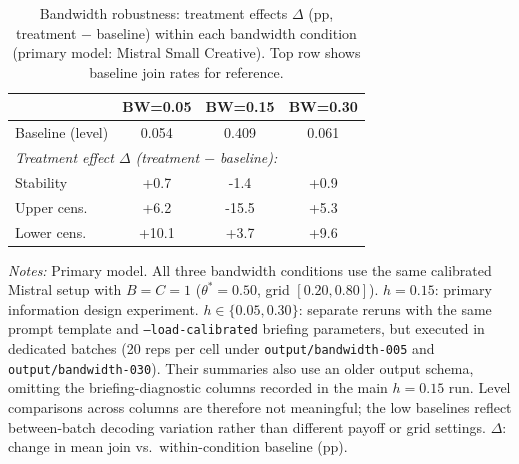 \begin{table}[t]
\centering
\caption{Bandwidth robustness: treatment effects $\Delta$ (pp, treatment $-$ baseline) within each bandwidth condition (primary model: Mistral Small Creative). Top row shows baseline join rates for reference.}
\label{tab:bandwidth}
\small
\begin{tabular}{lccc}
\toprule
 & BW=0.05 & BW=0.15 & BW=0.30 \\
\midrule
Baseline (level) & 0.054 & 0.409 & 0.061 \\
\midrule
\multicolumn{4}{l}{\textit{Treatment effect $\Delta$ (treatment $-$ baseline):}} \\
Stability & +0.7 & -1.4 & +0.9 \\
Upper cens. & +6.2 & -15.5 & +5.3 \\
Lower cens. & +10.1 & +3.7 & +9.6 \\
\bottomrule
\end{tabular}
\vspace{0.25em}
\parbox{\columnwidth}{\footnotesize\emph{Notes:} Primary model. All three bandwidth conditions use the same calibrated Mistral setup with $B = C = 1$ ($\theta^* = 0.50$, grid $[0.20, 0.80]$). $h = 0.15$: primary information design experiment. $h \in \{0.05, 0.30\}$: separate reruns with the same prompt template and \texttt{--load-calibrated} briefing parameters, but executed in dedicated batches (20 reps per cell under \texttt{output/bandwidth-005} and \texttt{output/bandwidth-030}). Their summaries also use an older output schema, omitting the briefing-diagnostic columns recorded in the main $h = 0.15$ run. Level comparisons across columns are therefore not meaningful; the low baselines reflect between-batch decoding variation rather than different payoff or grid settings. $\Delta$: change in mean join vs.\ within-condition baseline (pp).}
\end{table}
